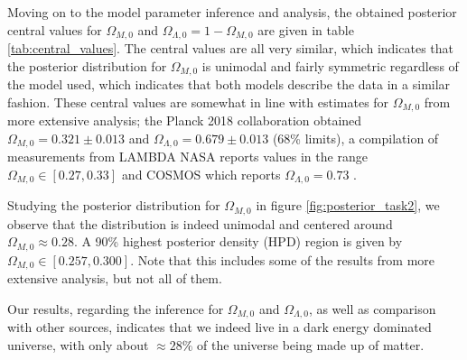 \documentclass[11pt,a4paper]{article}
\begin{document}
Moving on to the model parameter inference and analysis, the obtained posterior central values for $\Omega_{M,0}$ and $\Omega_{\Lambda,0}=1-\Omega_{M,0}$ are given in table \ref{tab:central_values}. The central values are all very similar, which indicates that the posterior distribution for $\Omega_{M,0}$ is unimodal and fairly symmetric regardless of the model used, which indicates that both models describe the data in a similar fashion. These central values are somewhat in line with estimates for $\Omega_{M,0}$ from more extensive analysis; the Planck 2018 collaboration obtained $\Omega_{M,0} = 0.321 \pm 0.013$ and $\Omega_{\Lambda,0} = 0.679 \pm 0.013$ \cite{planck} (68\% limits), a compilation of measurements from LAMBDA NASA reports values in the range $\Omega_{M,0}\in \left[0.27, 0.33 \right]$ \cite{lambdanasa} and COSMOS which reports $\Omega_{\Lambda,0} = 0.73$ \cite{cosmos}.

Studying the posterior distribution for $\Omega_{M,0}$ in figure \ref{fig:posterior_task2}, we observe that the distribution is indeed unimodal and centered around $\Omega_{M,0}\approx0.28$. A 90\% highest posterior density (HPD) region is given by $\Omega_{M,0} \in [0.257, 0.300]$. Note that this includes some of the results from more extensive analysis, but not all of them.

Our results, regarding the inference for $\Omega_{M,0}$ and $\Omega_{\Lambda,0}$, as well as comparison with other sources, indicates that we indeed live in a dark energy dominated universe, with only about $\approx 28\%$ of the universe being made up of matter.
\end{document}

